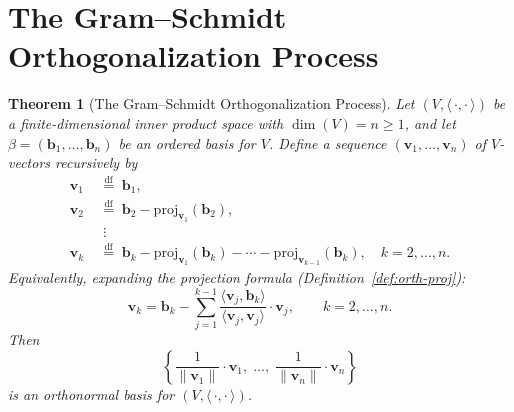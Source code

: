 \documentclass[11pt, a4paper, notitlepage]{report}
\newtheorem{theorem}{Theorem}[section]
\theoremstyle{definition}
\theoremstyle{remark}
\begin{document}
\section{The Gram--Schmidt Orthogonalization Process}
\label{sec:gram-schmidt}

\begin{theorem}[The Gram--Schmidt Orthogonalization Process]
\label{thm:gram-schmidt}
Let $(V,\langle\,\cdot,\cdot\,\rangle)$ be a finite-dimensional inner product space with
$\dim(V) = n\geq 1$, and let $\beta = (\mathbf{b}_1,\ldots,\mathbf{b}_n)$ be an ordered basis
for $V$.
Define a sequence $(\mathbf{v}_1,\ldots,\mathbf{v}_n)$ of $V$-vectors recursively by
\begin{align*}
  \mathbf{v}_1 &\;\stackrel{\mathrm{df}}{=}\; \mathbf{b}_1,\\
  \mathbf{v}_2 &\;\stackrel{\mathrm{df}}{=}\; \mathbf{b}_2 - \mathrm{proj}_{\mathbf{v}_1}(\mathbf{b}_2),\\
               &\;\;\vdots\\
  \mathbf{v}_k &\;\stackrel{\mathrm{df}}{=}\; \mathbf{b}_k
               - \mathrm{proj}_{\mathbf{v}_1}(\mathbf{b}_k)
               - \cdots
               - \mathrm{proj}_{\mathbf{v}_{k-1}}(\mathbf{b}_k),
               \quad k = 2,\ldots,n.
\end{align*}
Equivalently, expanding the projection formula
(Definition~\ref{def:orth-proj}):
\[
  \mathbf{v}_k = \mathbf{b}_k
    - \sum_{j=1}^{k-1}\frac{\langle\mathbf{v}_j,\mathbf{b}_k\rangle}{\langle\mathbf{v}_j,\mathbf{v}_j\rangle}\cdot\mathbf{v}_j,
  \qquad k = 2,\ldots,n.
\]
Then
\[
  \left\{\frac{1}{\|\mathbf{v}_1\|}\cdot\mathbf{v}_1,\;\ldots,\;\frac{1}{\|\mathbf{v}_n\|}\cdot\mathbf{v}_n\right\}
\]
is an orthonormal basis for $(V,\langle\,\cdot,\cdot\,\rangle)$.
\end{theorem}
\end{document}
